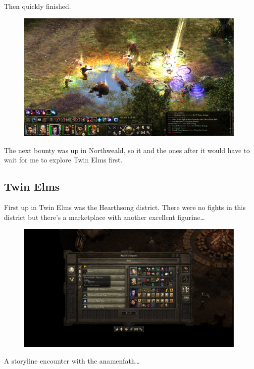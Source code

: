 \documentclass{article}
\begin{document}
Then quickly finished.

\begin{figure}
\includegraphics[scale=0.33]{files/blog/2019_03_04_pillars_of_eternity_path_of_the_damned_act_iii/2019_03_04_foemyna2.jpg}
\end{figure}

The next bounty was up in Northweald, so it and the ones after it would have to wait for me to explore Twin Elms first.

\subsection{Twin Elms}
First up in Twin Elms was the Hearthsong district.  There were no fights in this district but there's a marketplace with another excellent figurine\ldots

\begin{figure}
\includegraphics[scale=0.33]{files/blog/2019_03_04_pillars_of_eternity_path_of_the_damned_act_iii/2019_03_04_hearthsong1.jpg}
\end{figure}

A storyline encounter with the anamenfath\ldots
\end{document}
